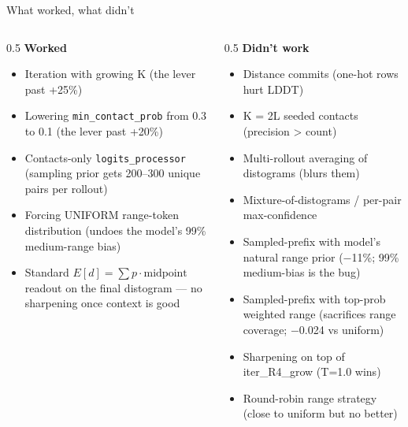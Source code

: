 \documentclass[aspectratio=169,11pt]{beamer}
\newcommand{\codeS}[1]{\texttt{\scriptsize\color{navy}#1}}
\begin{document}
\begin{frame}{What worked, what didn't}
  \begin{columns}[T]
    \begin{column}{0.5\textwidth}
      \textbf{\color{green}Worked}
      \begin{itemize}\footnotesize
        \setlength\itemsep{0.2em}
        \item Iteration with growing K (the lever past +25\%)
        \item Lowering \codeS{min\_contact\_prob} from 0.3 to 0.1
              (the lever past +20\%)
        \item Contacts-only \codeS{logits\_processor} (sampling
              prior gets 200--300 unique pairs per rollout)
        \item Forcing UNIFORM range-token distribution
              (undoes the model's 99\% medium-range bias)
        \item Standard $E[d] = \sum p \cdot \text{midpoint}$ readout
              on the final distogram --- no sharpening once context
              is good
      \end{itemize}
    \end{column}
    \begin{column}{0.5\textwidth}
      \textbf{\color{red}Didn't work}
      \begin{itemize}\footnotesize
        \setlength\itemsep{0.2em}
        \item Distance commits (one-hot rows hurt LDDT)
        \item K = 2L seeded contacts (precision > count)
        \item Multi-rollout averaging of distograms (blurs them)
        \item Mixture-of-distograms / per-pair max-confidence
        \item Sampled-prefix with model's natural range prior
              ($-$11\%; 99\% medium-bias is the bug)
        \item Sampled-prefix with top-prob weighted range
              (sacrifices range coverage; $-$0.024 vs uniform)
        \item Sharpening on top of iter\_R4\_grow (T=1.0 wins)
        \item Round-robin range strategy (close to uniform but no better)
      \end{itemize}
    \end{column}
  \end{columns}
\end{frame}
\end{document}
